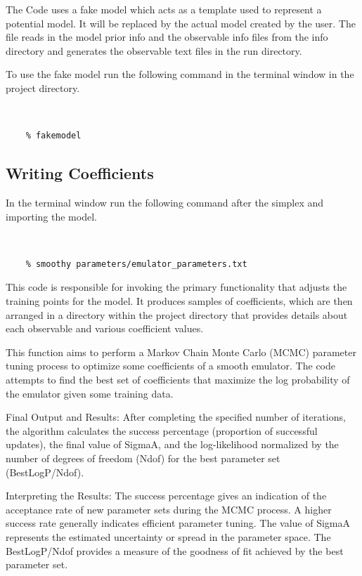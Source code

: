 \documentclass[12pt]{article}
\numberwithin{equation}{section}
\numberwithin{figure}{section}
\begin{document}
The Code uses a fake model which acts as a template used to represent a potential model. It will be replaced by the actual model created by the user. The file reads in the model prior info and the observable info files from the info directory and generates the observable text files in the run directory. 

To use the fake model run the following command in the terminal window in the project directory. 

{\tt 
\begin{verbatim}
    % fakemodel 
\end{verbatim}
}
 
\subsection{Writing Coefficients}

In the terminal window run the following command after the simplex and importing the model.

{\tt 
\begin{verbatim}
    % smoothy parameters/emulator_parameters.txt 
\end{verbatim}
}

This code is responsible for invoking the primary functionality that adjusts the training points for the model. It produces samples of coefficients, which are then arranged in a directory within the project directory that provides details about each observable and various coefficient values.

This function aims to perform a Markov Chain Monte Carlo (MCMC) parameter tuning process to optimize some coefficients of a smooth emulator. The code attempts to find the best set of coefficients that maximize the log probability of the emulator given some training data. 

Final Output and Results:
After completing the specified number of iterations, the algorithm calculates the success percentage (proportion of successful updates), the final value of SigmaA, and the log-likelihood normalized by the number of degrees of freedom (Ndof) for the best parameter set (BestLogP/Ndof).  

Interpreting the Results:
The success percentage gives an indication of the acceptance rate of new parameter sets during the MCMC process. A higher success rate generally indicates efficient parameter tuning. The value of SigmaA represents the estimated uncertainty or spread in the parameter space. The BestLogP/Ndof provides a measure of the goodness of fit achieved by the best parameter set. 
\end{document}
